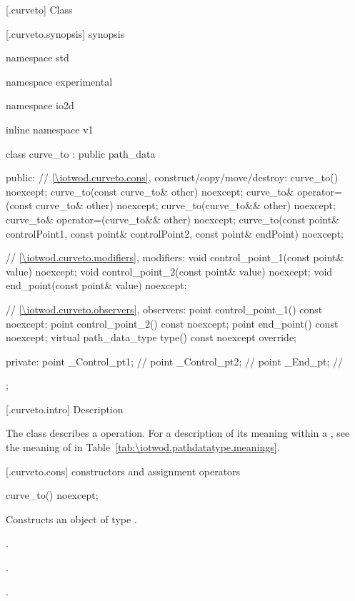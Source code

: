  [\iotwod.curveto] {Class }

 [\iotwod.curveto.synopsis] { synopsis}

\begin{codeblock}
namespace std { namespace experimental { namespace io2d { inline namespace v1 {
  class curve_to : public path_data {
  public:
    // \ref{\iotwod.curveto.cons}, construct/copy/move/destroy:
    curve_to() noexcept;
    curve_to(const curve_to& other) noexcept;
    curve_to& operator=(const curve_to& other) noexcept;
    curve_to(curve_to&& other) noexcept;
    curve_to& operator=(curve_to&& other) noexcept;
    curve_to(const point& controlPoint1, const point& controlPoint2,
      const point& endPoint) noexcept;

    // \ref{\iotwod.curveto.modifiers}, modifiers:
    void control_point_1(const point& value) noexcept;
    void control_point_2(const point& value) noexcept;
    void end_point(const point& value) noexcept;


    // \ref{\iotwod.curveto.observers}, observers:
    point control_point_1() const noexcept;
    point control_point_2() const noexcept;
    point end_point() const noexcept;
    virtual path_data_type type() const noexcept override;
    
  private:
    point _Control_pt1; // \expos
    point _Control_pt2; // \expos
    point _End_pt;      // \expos
  };
} } } }
\end{codeblock}

 [\iotwod.curveto.intro] { Description}

\pnum
{}
The class  describes a  operation. For a description of its meaning within a , see the meaning of  in Table~\ref{tab:\iotwod.pathdatatype.meanings}.

 [\iotwod.curveto.cons] { constructors and assignment operators}

\begin{itemdecl}
    curve_to() noexcept;
\end{itemdecl}
\begin{itemdescr}
	\pnum
	\effects
	Constructs an object of type .
	
	\pnum
	\postconditions
	.

	.

	.

\end{itemdescr}

